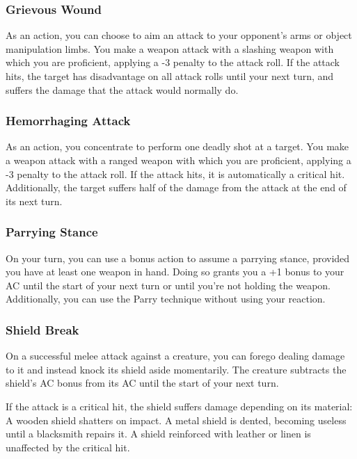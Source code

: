 \subsubsection{Grievous Wound} \label{tec::grievouswound}
As an action, you can choose to aim an attack to your opponent's arms or object manipulation limbs.
You make a weapon attack with a slashing weapon with which you are proficient, applying a -3 penalty to the attack roll.
If the attack hits, the target has disadvantage on all attack rolls until your next turn, and suffers the damage that the attack would normally do.

\subsubsection{Hemorrhaging Attack} \label{tec::hemorrhagingattack}
As an action, you concentrate to perform one deadly shot at a target.
You make a weapon attack with a ranged weapon with which you are proficient, applying a -3 penalty to the attack roll.
If the attack hits, it is automatically a critical hit.
Additionally, the target suffers half of the damage from the attack at the end of its next turn.

\subsubsection{Parrying Stance} \label{tec::parryingstance}
On your turn, you can use a bonus action to assume a parrying stance, provided you have at least one weapon in hand.
Doing so grants you a +1 bonus to your AC until the start of your next turn or until you're not holding the weapon.
Additionally, you can use the Parry technique without using your reaction.

\subsubsection{Shield Break} \label{tec::shieldbreak}
On a successful melee attack against a creature, you can forego dealing damage to it and instead knock its shield aside momentarily.
The creature subtracts the shield's AC bonus from its AC until the start of your next turn.

If the attack is a critical hit, the shield suffers damage depending on its material:
A wooden shield shatters on impact.
A metal shield is dented, becoming useless until a blacksmith repairs it.
A shield reinforced with leather or linen is unaffected by the critical hit.

